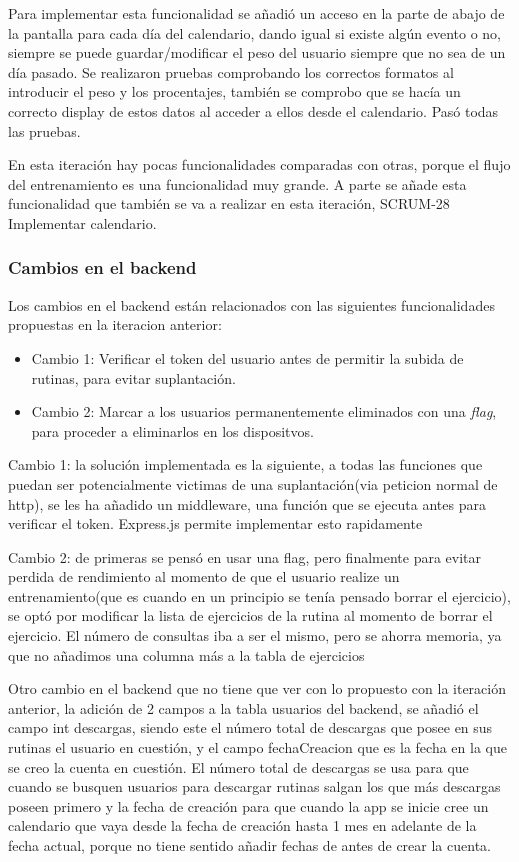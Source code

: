 Para implementar esta funcionalidad se añadió un acceso en la parte de abajo de la pantalla para cada día del calendario, dando igual si existe algún evento o no, siempre se puede guardar/modificar el peso del usuario siempre que no sea de un día pasado. Se realizaron pruebas comprobando los correctos formatos al introducir el peso y los procentajes, también se comprobo que se hacía un correcto display de estos datos al acceder a ellos desde el calendario. Pasó todas las pruebas.

En esta iteración hay pocas funcionalidades comparadas con otras, porque el flujo del entrenamiento es una funcionalidad muy grande. A parte se añade esta funcionalidad que también se va a realizar en esta iteración, SCRUM-28 Implementar calendario.

\subsubsection{Cambios en el backend}

Los cambios en el backend están relacionados con las siguientes funcionalidades propuestas en la iteracion anterior:

\begin{itemize}
	\item Cambio 1: Verificar el token del usuario antes de permitir la subida de rutinas, para evitar suplantación.
  	\item Cambio 2: Marcar a los usuarios permanentemente eliminados con una \textit{flag}, para proceder a eliminarlos en los dispositvos.
\end{itemize}

Cambio 1: la solución implementada es la siguiente, a todas las funciones que puedan ser potencialmente victimas de una suplantación(via peticion normal de http), se les ha añadido un middleware, una función que se ejecuta antes para verificar el token. Express.js permite implementar esto rapidamente

Cambio 2: de primeras se pensó en usar una flag, pero finalmente para evitar perdida de rendimiento al momento de que el usuario realize un entrenamiento(que es cuando en un principio se tenía pensado borrar el ejercicio), se optó por modificar la lista de ejercicios de la rutina al momento de borrar el ejercicio. El número de consultas iba a ser el mismo, pero se ahorra memoria, ya que no añadimos una columna más a la tabla de ejercicios

Otro cambio en el backend que no tiene que ver con lo propuesto con la iteración anterior, la adición de 2 campos a la tabla usuarios del backend, se añadió el campo int descargas, siendo este el número total de descargas que posee en sus rutinas el usuario en cuestión, y el campo fechaCreacion que es la fecha en la que se creo la cuenta en cuestión. El número total de descargas se usa para que cuando se busquen usuarios para descargar rutinas salgan los que más descargas poseen primero y la fecha de creación para que cuando la app se inicie cree un calendario que vaya desde la fecha de creación hasta 1 mes en adelante de la fecha actual, porque no tiene sentido añadir fechas de antes de crear la cuenta.

